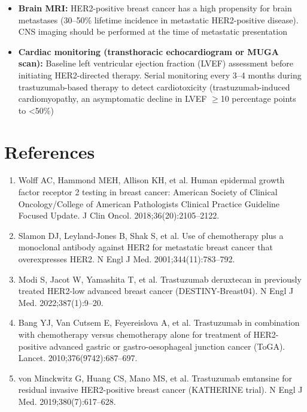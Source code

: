 \begin{itemize}
  \item \textbf{Brain MRI:} HER2-positive breast cancer has a high propensity for brain metastases (30--50\% lifetime incidence in metastatic HER2-positive disease). CNS imaging should be performed at the time of metastatic presentation
  \item \textbf{Cardiac monitoring (transthoracic echocardiogram or MUGA scan):} Baseline left ventricular ejection fraction (LVEF) assessment before initiating HER2-directed therapy. Serial monitoring every 3--4 months during trastuzumab-based therapy to detect cardiotoxicity (trastuzumab-induced cardiomyopathy, an asymptomatic decline in LVEF $\geq$10 percentage points to <50\%)
\end{itemize}

\section*{References}
\begin{enumerate}
  \item Wolff AC, Hammond MEH, Allison KH, et al. Human epidermal growth factor receptor 2 testing in breast cancer: American Society of Clinical Oncology/College of American Pathologists Clinical Practice Guideline Focused Update. J Clin Oncol. 2018;36(20):2105--2122.
  \item Slamon DJ, Leyland-Jones B, Shak S, et al. Use of chemotherapy plus a monoclonal antibody against HER2 for metastatic breast cancer that overexpresses HER2. N Engl J Med. 2001;344(11):783--792.
  \item Modi S, Jacot W, Yamashita T, et al. Trastuzumab deruxtecan in previously treated HER2-low advanced breast cancer (DESTINY-Breast04). N Engl J Med. 2022;387(1):9--20.
  \item Bang YJ, Van Cutsem E, Feyereislova A, et al. Trastuzumab in combination with chemotherapy versus chemotherapy alone for treatment of HER2-positive advanced gastric or gastro-oesophageal junction cancer (ToGA). Lancet. 2010;376(9742):687--697.
  \item von Minckwitz G, Huang CS, Mano MS, et al. Trastuzumab emtansine for residual invasive HER2-positive breast cancer (KATHERINE trial). N Engl J Med. 2019;380(7):617--628.
\end{enumerate}

\clearpage
